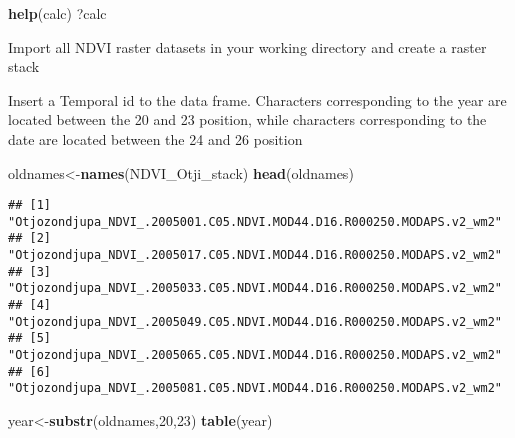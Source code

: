 \documentclass[]{article}
\newenvironment{Shaded}{\begin{snugshade}}{\end{snugshade}}
\newcommand{\KeywordTok}[1]{\textcolor[rgb]{0.13,0.29,0.53}{\textbf{{#1}}}}
\newcommand{\DataTypeTok}[1]{\textcolor[rgb]{0.13,0.29,0.53}{{#1}}}
\newcommand{\DecValTok}[1]{\textcolor[rgb]{0.00,0.00,0.81}{{#1}}}
\newcommand{\StringTok}[1]{\textcolor[rgb]{0.31,0.60,0.02}{{#1}}}
\newcommand{\OtherTok}[1]{\textcolor[rgb]{0.56,0.35,0.01}{{#1}}}
\newcommand{\NormalTok}[1]{{#1}}
\begin{document}
\begin{Shaded}
\begin{Highlighting}[]
\KeywordTok{help}\NormalTok{(calc)}
\NormalTok{?calc}
\end{Highlighting}
\end{Shaded}

Import all NDVI raster datasets in your working directory and create a
raster stack

\begin{Shaded}
\end{Shaded}

Insert a Temporal id to the data frame. Characters corresponding to the
year are located between the 20 and 23 position, while characters
corresponding to the date are located between the 24 and 26 position

\begin{Shaded}
\begin{Highlighting}[]
\NormalTok{oldnames<-}\KeywordTok{names}\NormalTok{(NDVI_Otji_stack)}
\KeywordTok{head}\NormalTok{(oldnames)}
\end{Highlighting}
\end{Shaded}

\begin{verbatim}
## [1] "Otjozondjupa_NDVI_.2005001.C05.NDVI.MOD44.D16.R000250.MODAPS.v2_wm2"
## [2] "Otjozondjupa_NDVI_.2005017.C05.NDVI.MOD44.D16.R000250.MODAPS.v2_wm2"
## [3] "Otjozondjupa_NDVI_.2005033.C05.NDVI.MOD44.D16.R000250.MODAPS.v2_wm2"
## [4] "Otjozondjupa_NDVI_.2005049.C05.NDVI.MOD44.D16.R000250.MODAPS.v2_wm2"
## [5] "Otjozondjupa_NDVI_.2005065.C05.NDVI.MOD44.D16.R000250.MODAPS.v2_wm2"
## [6] "Otjozondjupa_NDVI_.2005081.C05.NDVI.MOD44.D16.R000250.MODAPS.v2_wm2"
\end{verbatim}

\begin{Shaded}
\begin{Highlighting}[]
\NormalTok{year<-}\KeywordTok{substr}\NormalTok{(oldnames,}\DecValTok{20}\NormalTok{,}\DecValTok{23}\NormalTok{)}
\KeywordTok{table}\NormalTok{(year)}
\end{Highlighting}
\end{Shaded}
\end{document}
